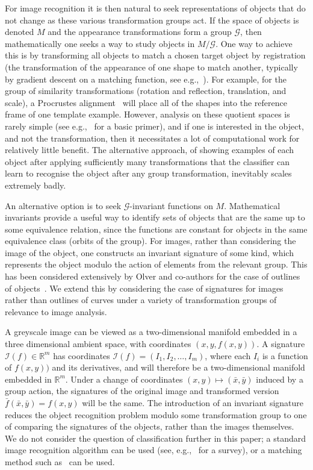 \documentclass[review,onefignum,onetabnum]{siamonline190516}
\begin{document}
For image recognition it is then natural to seek representations of objects that do not change as these various transformation groups act. If the space of objects is denoted $M$ and the appearance transformations form a group $\mathcal{G}$, then mathematically one seeks a way to study objects in $M / \mathcal{G}$. One way to achieve this is by transforming all objects to match a chosen target object by registration (the transformation of the appearance of one shape to match another, typically by gradient descent on a matching function, see e.g.,~\citep{Modersitzki03}). For example, for the group of similarity transformations (rotation and reflection, translation, and scale), a Procrustes alignment~\citep{Kendall1989} will place all of the shapes into the reference frame of one template example. However, analysis on these quotient spaces is rarely simple (see e.g.,~\citet{RiemannianStats} for a basic primer), and if one is interested in the object, and not the transformation, then it necessitates a lot of computational work for relatively little benefit. The alternative approach, of showing examples of each object after applying sufficiently many transformations that the classifier can learn to recognise the object after any group transformation, inevitably scales extremely badly.

An alternative option is to seek $\mathcal{G}$-invariant functions on $M$. Mathematical invariants provide a useful way to identify sets of objects that are the same up to some equivalence relation, since the functions are constant for objects in the same equivalence class (orbits of the group). For images, rather than considering the image of the object, one constructs an invariant signature of some kind, which represents the object modulo the action of elements from the relevant group. This has been considered extensively by Olver and co-authors for the case of outlines of objects~\citep{Calabi1998,Hoff2013}. We extend this by considering the case of signatures for images rather than outlines of curves under a variety of transformation groups of relevance to image analysis.

A greyscale image can be viewed as a two-dimensional manifold embedded in a three dimensional ambient space, with coordinates $(x, y, f(x,y))$. A signature $\mathcal{I}(f) \in \mathbb{R}^m$ has coordinates $\mathcal{I}(f) = (I_1, I_2, \ldots, I_m)$, where each $I_i$ is a function of $f(x, y))$ and its derivatives, and will therefore be a two-dimensional manifold embedded in $\mathbb{R}^m$. Under a change of coordinates $(x, y) \mapsto (\bar{x}, \bar{y})$ induced by a group action, the signatures of the original image and transformed version $\bar{f}(\bar{x}, \bar{y}) = f(x, y)$ will be the same. The introduction of an invariant signature reduces the object recognition problem modulo some transformation group to one of comparing the signatures of the objects, rather than the images themselves. We do not consider the question of classification further in this paper; a standard image recognition algorithm can be used (see, e.g.,~\citet{Zhang20} for a survey), or a matching method such as~\citet{UsCurrents} can be used.
\end{document}
